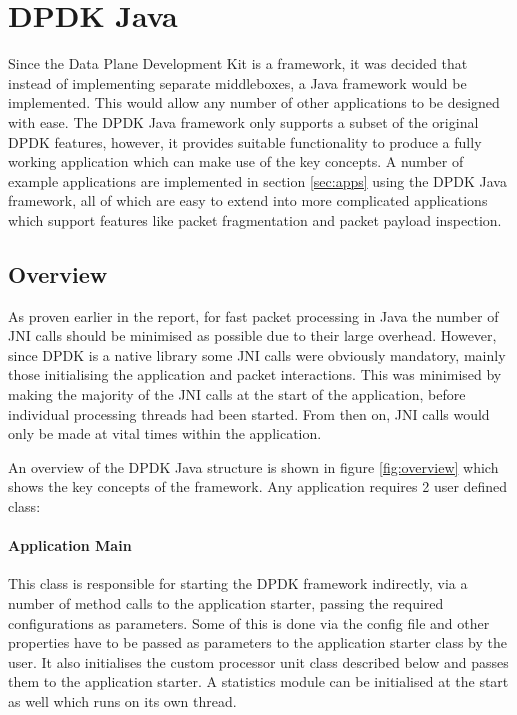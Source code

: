 \documentclass[final_report.tex]{subfiles}
\begin{document}
\section{DPDK Java}
\label{sec:implementation}
Since the Data Plane Development Kit is a framework, it was decided that instead of implementing separate middleboxes, a Java framework would be implemented. This would allow any number of other applications to be designed with ease. The DPDK Java framework only supports a subset of the original DPDK features, however, it provides suitable functionality to produce a fully working application which can make use of the key concepts. A number of example applications are implemented in section \ref{sec:apps} using the DPDK Java framework, all of which are easy to extend into more complicated applications which support features like packet fragmentation and packet payload inspection.

\subsection{Overview}
As proven earlier in the report, for fast packet processing in Java the number of JNI calls should be minimised as possible due to their large overhead. However, since DPDK is a native library some JNI calls were obviously mandatory, mainly those initialising the application and packet interactions. This was minimised by making the majority of the JNI calls at the start of the application, before individual processing threads had been started. From then on, JNI calls would only be made at vital times within the application.

An overview of the DPDK Java structure is shown in figure \ref{fig:overview} which shows the key concepts of the framework. Any application requires 2 user defined class:

\paragraph*{Application Main} This class is responsible for starting the DPDK framework indirectly, via a number of method calls to the application starter, passing the required configurations as parameters. Some of this is done via the config file and other properties have to be passed as parameters to the application starter class by the user. It also initialises the custom processor unit class described below and passes them to the application starter. A statistics module can be initialised at the start as well which runs on its own thread.
\end{document}
